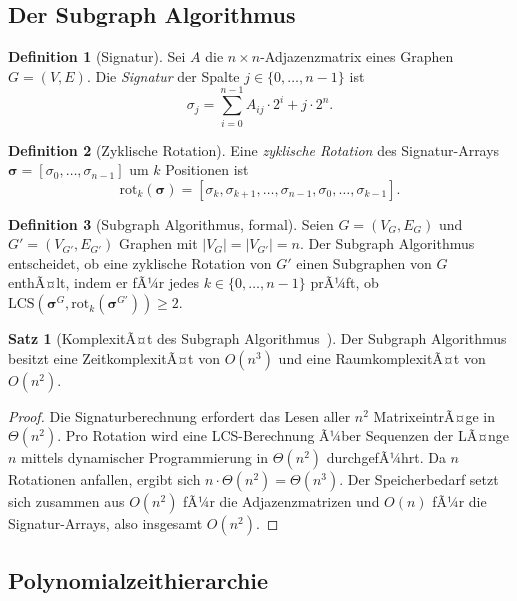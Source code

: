 ﻿\documentclass[a4paper,12pt]{article}
\theoremstyle{definition}
\newtheorem{definition}{Definition}
\newtheorem{satz}{Satz}
\begin{document}
\subsection{Der Subgraph Algorithmus}

\begin{definition}[Signatur]
  Sei $A$ die $n \times n$-Adjazenzmatrix eines Graphen $G = (V, E)$.
  Die \emph{Signatur} der Spalte $j \in \{0, \ldots, n-1\}$ ist
  \[
    \sigma_j = \sum_{i=0}^{n-1} A_{ij} \cdot 2^i + j \cdot 2^n.
  \]
\end{definition}

\begin{definition}[Zyklische Rotation]
  Eine \emph{zyklische Rotation} des Signatur-Arrays
  $\boldsymbol{\sigma} = [\sigma_0, \ldots, \sigma_{n-1}]$ um $k$ Positionen ist
  \[
    \mathrm{rot}_k(\boldsymbol{\sigma}) = [\sigma_k, \sigma_{k+1}, \ldots, \sigma_{n-1},
    \sigma_0, \ldots, \sigma_{k-1}].
  \]
\end{definition}

\begin{definition}[Subgraph Algorithmus, formal]
\label{def:algo}
  Seien $G = (V_G, E_G)$ und $G' = (V_{G'}, E_{G'})$ Graphen mit $|V_G| = |V_{G'}| = n$.
  Der Subgraph Algorithmus entscheidet, ob eine zyklische Rotation von $G'$ einen Subgraphen
  von $G$ enthÃ¤lt, indem er fÃ¼r jedes $k \in \{0, \ldots, n-1\}$ prÃ¼ft, ob
  $\mathrm{LCS}(\boldsymbol{\sigma}^G, \mathrm{rot}_k(\boldsymbol{\sigma}^{G'})) \geq 2$.
\end{definition}

\begin{satz}[KomplexitÃ¤t des Subgraph Algorithmus~\cite{epp2026subgraph}]
\label{satz:komplex}
  Der Subgraph Algorithmus besitzt eine ZeitkomplexitÃ¤t von $O(n^3)$
  und eine RaumkomplexitÃ¤t von $O(n^2)$.
\end{satz}

\begin{proof}
  Die Signaturberechnung erfordert das Lesen aller $n^2$ MatrixeintrÃ¤ge
  in $\Theta(n^2)$.
  Pro Rotation wird eine LCS-Berechnung Ã¼ber Sequenzen der LÃ¤nge $n$
  mittels dynamischer Programmierung in $\Theta(n^2)$ durchgefÃ¼hrt.
  Da $n$ Rotationen anfallen, ergibt sich $n \cdot \Theta(n^2) = \Theta(n^3)$.
  Der Speicherbedarf setzt sich zusammen aus $O(n^2)$ fÃ¼r die Adjazenzmatrizen
  und $O(n)$ fÃ¼r die Signatur-Arrays, also insgesamt $O(n^2)$.
\end{proof}

\subsection{Polynomialzeithierarchie}
\end{document}
